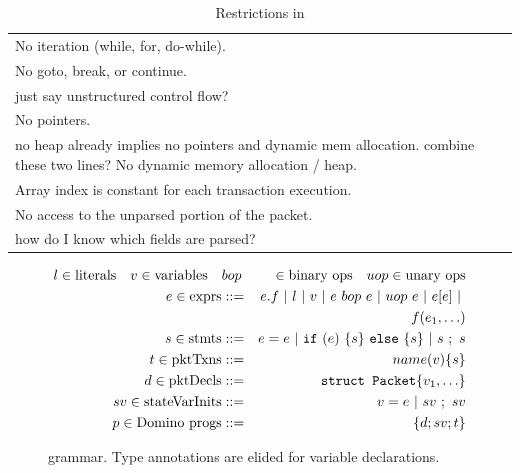 \begin{table}
  \begin{tabular}{p{}}
    No iteration (while, for, do-while).\\
    No goto, break, or continue.\\ \ac{just say unstructured control flow?}\\
    No pointers.\\ \ac{no heap already implies no pointers and dynamic mem allocation. combine these two lines?}
    No dynamic memory allocation / heap.\\
    Array index is constant for each transaction execution.\\
    No access to the unparsed portion of the packet.\\
    \ac{how do I know which fields are parsed?}\\
  \end{tabular}
  \caption{Restrictions in \pktlanguage}
  \label{tab:restrict}
\end{table}

\begin{figure}
\newcommand{\sep}{~|~}
\begin{scriptsize}
\begin{eqnarray*}
l \in \text{literals} \quad v \in \text{variables} \quad &bop& \in \text{binary ops} \quad
uop \in \text{unary ops} \\
%
e \in \text{exprs} &::=& e.f \sep l \sep v \sep e~bop~e \sep uop~e \sep e[e] \sep \\
                   & &   f(e_1, \ldots) \\
%
s \in \text{stmts} &::=& e = e \sep {\tt if}~(e)~\{ s \}~{\tt else}~ \{ s \} \sep s~;~s \\
%
t \in \text{pktTxns} &::=& name(v) \{ s \} \\
%
%
d \in \text{pktDecls} &::=& \text{\tt struct Packet} \{ v_1, \ldots \} \\
%
sv \in \text{stateVarInits} &::=& v = e \sep sv~;~sv \\
%
p \in \text{\pktlanguage progs} &::=& \{ d ; sv; t \}
\end{eqnarray*}
\end{scriptsize}
\caption{\pktlanguage grammar. Type annotations are elided for variable declarations.}
\label{fig:grammar}
\end{figure}



